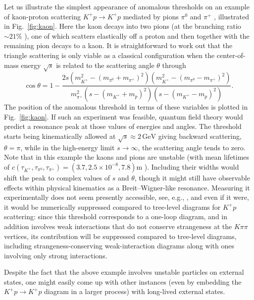 \documentclass[12pt]{article}
\numberwithin{figure}{section}
\def \be {\begin{equation}}
\def \ee {\end{equation}}
\begin{document}
	Let us illustrate the simplest appearance of anomalous thresholds on an example of kaon-proton scattering $K^+ p \to K^+ p$ mediated by pions $\pi^{0}$ and $\pi^+$ \cite{RevModPhys.33.448}, illustrated in Fig.~\ref{fig:kaon}.
	Here the kaon decays into two pions (at the branching ratio $\sim 21\%$ \cite{ParticleDataGroup:2020ssz}), one of which scatters elastically off a proton and then together with the remaining pion decays to a kaon.
	It is straightforward to work out that the triangle scattering is only viable as a classical configuration when the center-of-mass energy $\sqrt{s}$ is related to the scattering angle $\theta$ through
	\be
	\cos \theta = 1 - \frac{2s \left(m_{K^+}^2 - (m_{\pi^0} + m_{\pi^+})^2\right)\left(m_{K^+}^2 - (m_{\pi^0} - m_{\pi^+})^2\right)}{m_{\pi^+}^{2}\left(s- (m_{K^+}+m_p)^2\right)\left(s -(m_{K^+}-m_p)^2\right)}.
	\ee
	The position of the anomalous threshold in terms of these variables is plotted in Fig.~\ref{fig:kaon}. If such an experiment was feasible, quantum field theory would predict a resonance peak at those values of energies and angles. The threshold starts being kinematically allowed at $\sqrt{s}\approx 2\, \mathrm{GeV}$ giving backward scattering, $\theta = \pi$, while in the high-energy limit $s \to \infty$, the scattering angle  tends to zero. Note that in this example the kaons and pions are unstable (with mean lifetimes of $c(\tau_{K^+}, \tau_{\pi^0}, \tau_{\pi^+}) = (3.7, 2.5 \times 10^{-8}, 7.8)\mathrm{m}$ \cite{ParticleDataGroup:2020ssz}). Including their widths would shift the peak to complex values of $s$ and $\theta$, though it might still have observable effects within physical kinematics as a Breit--Wigner-like resonance. Measuring it experimentally does not seem presently accessible, see, e.g., \cite{Morrison:1969zzb,ALICE:2021szj}, and even if it were, it would be numerically suppressed compared to tree-level diagrams for $K^+p$ scattering: since this threshold corresponds to a one-loop diagram, and in addition involves weak interactions that do not conserve strangeness at the $K\pi\pi$ vertices, its contribution will be suppressed compared to tree-level diagrams, including strangeness-conserving weak-interaction diagrams along with ones involving only strong interactions.
	
	Despite the fact that the above example involves unstable particles on external states, one might easily come up with other instances (even by embedding the $K^+ p \to K^+ p$ diagram in a larger process) with long-lived external states. 
	
\end{document}
